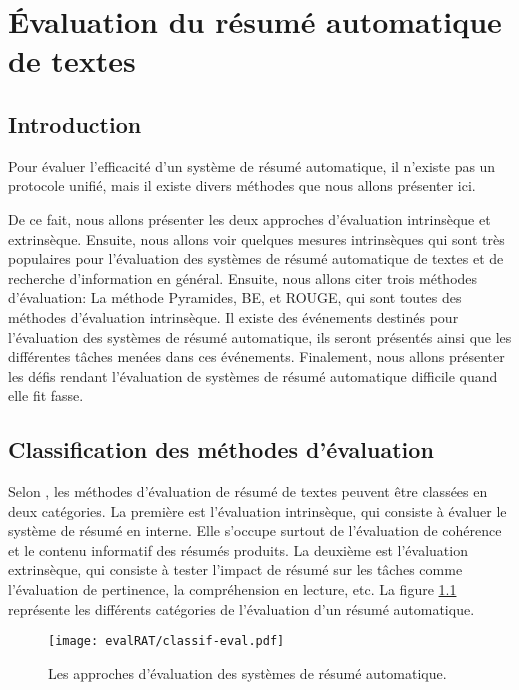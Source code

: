 \documentclass[a4paper,12pt,oneside]{../use/ESIthesis}
\begin{document}
  	 	
  	 	\dominitoc 
  	 	\mainmatter
  \fi

\chapter{Évaluation du résumé automatique de textes}
\label{chap:evalRAT}
\minitoc

\section{Introduction}

Pour évaluer l'efficacité d'un système de résumé automatique, il n'existe pas un protocole unifié, mais il existe divers méthodes que nous allons présenter ici. 

De ce fait, nous allons présenter les deux approches d'évaluation intrinsèque et extrinsèque. 
Ensuite, nous allons voir quelques mesures intrinsèques qui sont très populaires pour l'évaluation des systèmes de résumé automatique de textes et de recherche d'information en général. 
Ensuite, nous allons citer trois méthodes d'évaluation: La méthode Pyramides, BE, et ROUGE, qui sont toutes des méthodes d'évaluation intrinsèque. 
Il existe des événements destinés pour l'évaluation des systèmes de résumé automatique, ils seront présentés ainsi que les différentes tâches menées dans ces événements. 
Finalement, nous allons présenter les défis rendant l'évaluation de systèmes de résumé automatique difficile quand elle fit fasse.

\section{Classification des méthodes d'évaluation}

Selon \cite{01-mani}, les méthodes d'évaluation de résumé de textes peuvent être classées en deux catégories. 
La première est l'évaluation intrinsèque, qui consiste à évaluer le système de résumé en interne. 
Elle s'occupe surtout de l'évaluation de cohérence et le contenu informatif des résumés produits. 
La deuxième est l'évaluation extrinsèque, qui consiste à tester l'impact de résumé sur les tâches comme l'évaluation de pertinence, la compréhension en lecture, etc. 
La figure \ref{fig:classif-eval} représente les différents catégories de l'évaluation d'un résumé automatique. 
%
\begin{figure}[ht]
\begin{center}
\texttt{[image: evalRAT/classif-eval.pdf]} %
 \caption{Les approches d'évaluation des systèmes de résumé automatique.}
 \label{fig:classif-eval}
\end{center}
\end{figure}
\end{document}
